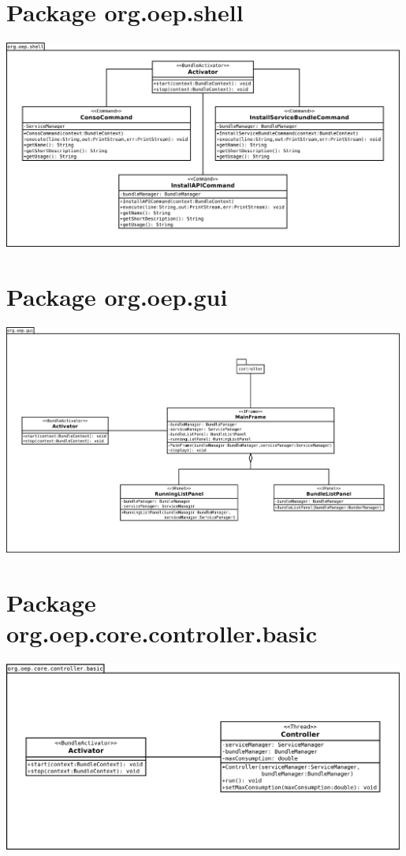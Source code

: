 \documentclass[a4paper, 11pt]{report}
\begin{document}
\section{Package org.oep.shell}
	\begin{centering}
		\includegraphics[width=0.99\textwidth]{figures/EcoPattern_Shell_Classes}
	\end{centering}
\section{Package org.oep.gui}
	\begin{centering}
		\includegraphics[width=0.99\textwidth]{figures/EcoPattern_Gui_Classes}
	\end{centering}
\section{Package org.oep.core.controller.basic}
	\begin{centering}
		\includegraphics[width=0.99\textwidth]{figures/EcoPattern_Controller_Basic_Classes}
	\end{centering}
\end{document}
